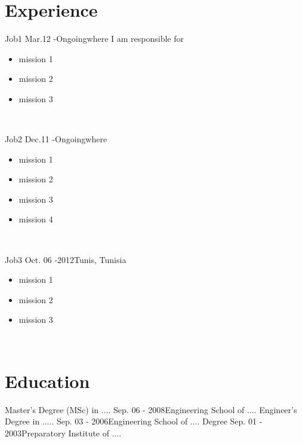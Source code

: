 \documentclass[]{cv-class}
\begin{document}
\vspace{0.5cm}
\section{Experience}


\entrymod
{Job1}
{Mar.12 -Ongoing}{where}
I am responsible for
\begin{itemize}
\item mission 1  
\item mission 2 
\item  mission 3
\end{itemize}
~

\entrymod
 {Job2}
 {Dec.11 -Ongoing}{where}
\begin{itemize}
\item mission 1
\item mission 2 
\item mission 3
\item mission 4
\end{itemize}
~

\entrymod
 {Job3}
{Oct. 06 -2012}{Tunis, Tunisia}
\begin{itemize}
\item mission 1 
\item mission 2
\item mission 3 
\end{itemize}
~

\section{Education}
\entrymod
 {Master's Degree (MSc) in ....}
{Sep. 06 - 2008}{Engineering School of ....}
\vspace{0.5cm}
\entrymod
 {Engineer's Degree in .....}
{Sep. 03 - 2006}{Engineering School of ....}
\vspace{0.5cm}
\entrymod
 { Degree }
{Sep. 01 - 2003}{Preparatory Institute of ....}
\end{document}
